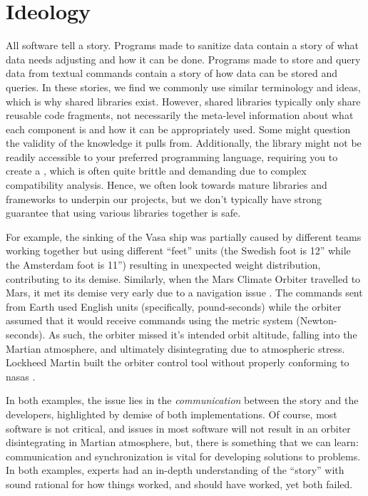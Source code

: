 \chapter[Ideology]{Ideology\footnotemark}
\label{chap:ideology}

All software tell a story. Programs made to sanitize data contain a story of
what data needs adjusting and how it can be done. Programs made to store and
query data from textual commands contain a story of how data can be stored and
queries. In these stories, we find we commonly use similar terminology and
ideas, which is why shared libraries exist. However, shared libraries typically
only share reusable code fragments, not necessarily the meta-level information
about what each component is and how it can be appropriately used. Some might
question the validity of the knowledge it pulls from. Additionally, the library
might not be readily accessible to your preferred programming language,
requiring you to create a , which is often quite brittle and demanding
due to complex compatibility analysis. Hence, we often look towards mature
libraries and frameworks to underpin our projects, but we don't typically have
strong guarantee that using various libraries together is safe.

For example, the sinking of the Vasa ship \cite{wiki:Vasa_ship} was partially
caused by different teams working together but using different ``feet'' units
(the Swedish foot is 12'' while the Amsterdam foot is 11'') resulting in
unexpected weight distribution, contributing to its demise. Similarly, when the
Mars Climate Orbiter travelled to Mars, it met its demise very early due to a
navigation issue \cite{Siddiqi2018}. The commands sent from Earth used English
units (specifically, pound-seconds) while the orbiter assumed that it would
receive commands using the metric system (Newton-seconds). As such, the orbiter
missed it's intended orbit altitude, falling into the Martian atmosphere, and
ultimately disintegrating due to atmospheric stress. Lockheed Martin built the
orbiter control tool without properly conforming to \acsp{nasa} .

In both examples, the issue lies in the \textit{communication} between the story
and the developers, highlighted by demise of both implementations. Of course,
most software is not critical, and issues in most software will not result in an
orbiter disintegrating in Martian atmosphere, but, there is something that we
can learn: communication and synchronization is vital for developing solutions
to problems. In both examples, experts had an in-depth understanding of the
``story'' with sound rational for how things worked, and should have worked, yet
both failed.

